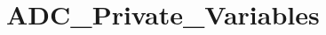\hypertarget{group___a_d_c___private___variables}{\section{A\-D\-C\-\_\-\-Private\-\_\-\-Variables}
\label{group___a_d_c___private___variables}
}
